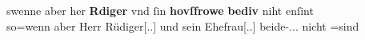 \begin{exe}
\ex \label{ex:gendres2}
		\gll swenne aber her \textbf{Rdiger} vnd ſin
			\textbf{hovſfrowe} \textbf{bediv} niht enſint\\
			so=wenn aber Herr Rüdiger[\Nom.\Sg.\MascM] und sein
			Ehefrau[\Nom.\Sg.\FemF] beide-\Nom.\Pl.\NeutMF.\St{} nicht
			\Neg=sind\\
		\begin{taggedline}{\parencites(Regensburg, 1299)[\pno~3262, 425.13--14]{cao4}}
		\trans {}
		\end{taggedline}


\end{exe}
